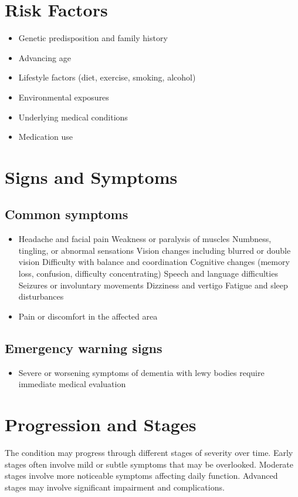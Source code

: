 \section{Risk Factors}
\begin{itemize}[noitemsep]
  \item Genetic predisposition and family history
  \item Advancing age
  \item Lifestyle factors (diet, exercise, smoking, alcohol)
  \item Environmental exposures
  \item Underlying medical conditions
  \item Medication use
\end{itemize}
\section{Signs and Symptoms}

\subsection{Common symptoms}
\begin{itemize}[noitemsep]
  \item Headache and facial pain Weakness or paralysis of muscles Numbness, tingling, or abnormal sensations Vision changes including blurred or double vision Difficulty with balance and coordination Cognitive changes (memory loss, confusion, difficulty concentrating) Speech and language difficulties Seizures or involuntary movements Dizziness and vertigo Fatigue and sleep disturbances
  \item Pain or discomfort in the affected area
  \end{itemize}

\subsection{Emergency warning signs}
\begin{itemize}[noitemsep]
  \item Severe or worsening symptoms of dementia with lewy bodies require immediate medical evaluation
\end{itemize}
\section{Progression and Stages}
The condition may progress through different stages of severity over time. Early stages often involve mild or subtle symptoms that may be overlooked. Moderate stages involve more noticeable symptoms affecting daily function. Advanced stages may involve significant impairment and complications.
